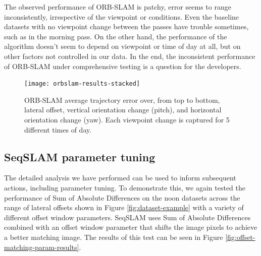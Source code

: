 \documentclass[letterpaper, 10 pt, conference]{ieeeconf}  %
\begin{document}
The observed performance of ORB-SLAM is patchy, error seems to range inconsistently, irrespective of the viewpoint or conditions. Even the baseline datasets with no viewpoint change between the passes have trouble sometimes, such as in the morning pass. On the other hand, the performance of the algorithm doesn't seem to depend on viewpoint or time of day at all, but on other factors not controlled in our data. In the end, the inconsistent performance of ORB-SLAM under comprehensive testing is a question for the developers.

\begin{figure}[t]
    \centering
    \texttt{[image: orbslam-results-stacked]}
   \caption{ORB-SLAM average trajectory error over, from top to bottom, lateral offset, vertical orientation change (pitch), and horizontal orientation change (yaw). Each viewpoint change is captured for 5 different times of day.}
    \label{fig:orbslam-results-stacked}
\end{figure}

%
%

\subsection{SeqSLAM parameter tuning}

The detailed analysis we have performed can be used to inform subsequent actions, including parameter tuning. To demonstrate this, we again tested the performance of Sum of Absolute Differences on the noon datasets across the range of lateral offsets shown in Figure \ref{fig:dataset-example} with a variety of different offset window parameters. SeqSLAM uses Sum of Absolute Differences combined with an offset window parameter that shifts the image pixels to achieve a better matching image. The results of this test can be seen in Figure \ref{fig:offset-matching-param-results}.
\end{document}
